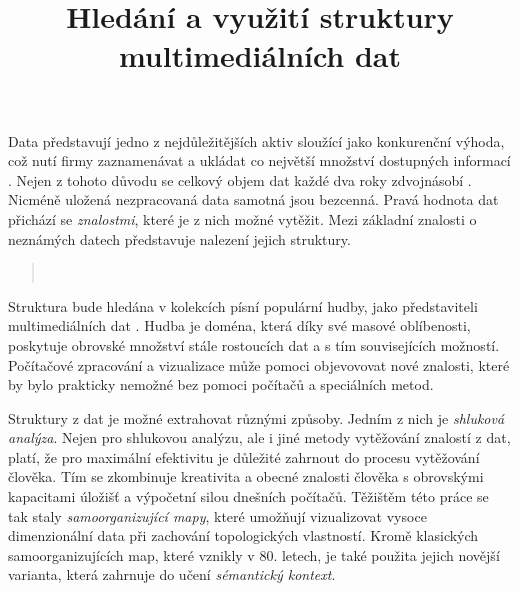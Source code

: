 \documentclass[thesis=M,czech]{FITthesis}[2012/06/26]
\title{Hledání a využití struktury multimediálních dat}
\begin{document}
\renewcommand\listingscaption{Ukázka}

\begin{introduction}

\begin{quote}
\end{quote}

Data představují jedno z nejdůležitějších aktiv sloužící jako konkurenční výhoda, což nutí firmy zaznamenávat a ukládat co největší množství dostupných informací \cite{most_val_asset}. Nejen z tohoto důvodu se celkový objem dat každé dva roky zdvojnásobí \cite{double}. Nicméně uložená nezpracovaná data samotná jsou bezcenná. Pravá hodnota dat přichází se \textit{znalostmi}, které je z nich možné vytěžit. Mezi základní znalosti o neznámých datech představuje nalezení jejich struktury.

\begin{quote}
    ~\cite{struktura}
\end{quote}

Struktura bude hledána v kolekcích písní populární hudby, jako představiteli multimediálních dat \cite{multimedia}. Hudba je doména, která díky své masové oblíbenosti, poskytuje obrovské množství stále rostoucích dat a s tím souvisejících možností. Počítačové zpracování a vizualizace může pomoci objevovovat nové znalosti, které by bylo prakticky nemožné bez pomoci počítačů a speciálních metod.









Struktury z dat je možné extrahovat různými způsoby. Jedním z nich je \textit{shluková analýza}. Nejen pro shlukovou analýzu, ale i jiné metody vytěžování znalostí z dat, platí, že pro maximální efektivitu je důležité zahrnout do procesu vytěžování člověka. Tím se zkombinuje kreativita a obecné znalosti člověka s obrovskými kapacitami úložišť a výpočetní silou dnešních počítačů.
Těžištěm této práce se tak staly \textit{samoorganizující mapy}, které umožňují vizualizovat vysoce dimenzionální data při zachování topologických vlastností. Kromě klasických samoorganizujících map, které vznikly v 80. letech, je také použita jejich novější varianta, která zahrnuje do učení \textit{sémantický kontext}.



\end{introduction}
\end{document}
